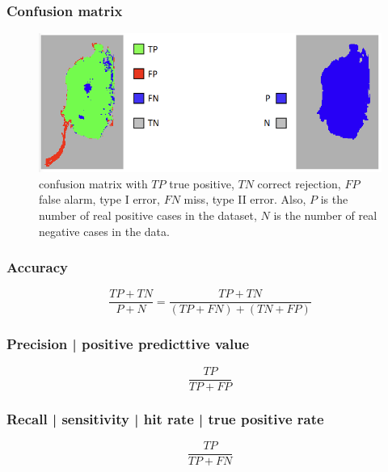 \documentclass[11pt]{article}
\begin{document}
\subsubsection{Confusion matrix}

\begin{figure}[H]
    \centering
    \includegraphics[width=.5\linewidth]{figures/confusion-matrix.png}
    \caption{confusion matrix with $TP$ true positive, $TN$ correct rejection, $FP$ false alarm, type I error, $FN$ miss, type II error. Also, $P$ is the number of real positive cases in the dataset, $N$ is the number of real negative cases in the data.}
\end{figure}

\subsubsection{Accuracy}

\begin{definition}[Accuracy]
    \begin{equation*}
        \frac{TP + TN}{P + N} = \frac{TP + TN}{(TP + FN) + (TN + FP)}
    \end{equation*}
\end{definition}

\subsubsection{Precision | positive predicttive value}

\begin{definition}[Precision]
    \begin{equation*}
        \frac{TP}{TP + FP}
    \end{equation*}
\end{definition}

\subsubsection{Recall | sensitivity | hit rate | true positive rate}

\begin{definition}[Recall]
    \begin{equation*}
        \frac{TP}{TP + FN}
    \end{equation*}
\end{definition}
\end{document}
